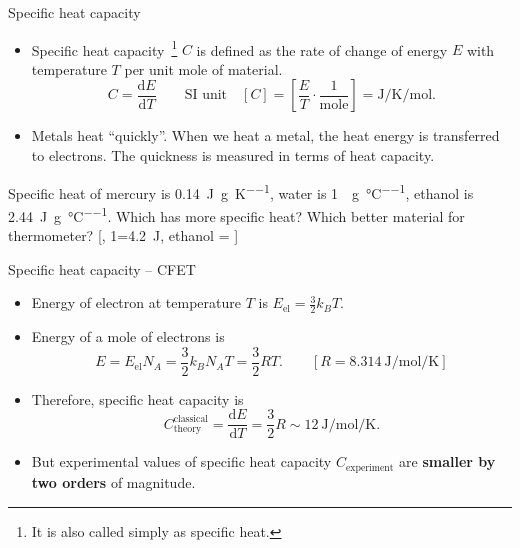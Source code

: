 %
%
%
\begin{frame}[label=pre-M2T1-slot1]{Specific heat capacity}
	\begin{definition}
		\begin{itemize}
			\item Specific heat capacity~\footnote{It is also called simply as specific heat.} \(C\) is defined as the rate of change of energy \(E\) with temperature \(T\) per unit mole of material.
			\[
			C = \frac{\mathrm{d}E}{\mathrm{d}T}
			\quad\quad
			\text{SI unit}
			\quad 
			[C] = \left[ \frac{E}{T}\cdot \frac{1}{\text{mole}}\right] = \si{\joule\per\kelvin\per\mole}.
			\]
		\end{itemize}
	\end{definition}
	\begin{itemize}
		\item Metals heat ``quickly''. When we heat a metal, the heat energy is transferred to electrons. The quickness is measured in terms of heat capacity.
	\end{itemize}
	\begin{problem}
		Specific heat of mercury is \SI{0.14}{\joule\per\gram\per\kelvin}, water is \SI{1}{\calorie\per\gram\per\celsius}, ethanol is \SI{2.44}{\joule\per\gram\per\celsius}. Which has more specific heat? Which better material for thermometer? \hfill [, \SI{1}{\calorie}=\SI{4.2}{\joule}, ethanol = ]
	\end{problem}
\end{frame}
%
\begin{frame}[label=pre-M2T1-slot1]{Specific heat capacity -- CFET}
		\begin{itemize}
		\item Energy of electron at temperature \(T\) is
		\(
		E_\mathrm{el} = \frac{3}{2} k_B T.
		\)
		\item Energy of a mole of electrons is
		\[
		E = E_\mathrm{el} N_A =  \frac{3}{2} k_B N_A T  = \frac{3}{2} R T. \qquad \left[R = \SI{8.314}{\joule\per\mole\per\kelvin} \right]
		\]
		\item Therefore, specific heat capacity is
		\[
		C_\mathrm{theory}^\text{classical} = \frac{\mathrm{d} E}{\mathrm{d} T} = \frac{3}{2} R \sim \SI{12}{\joule\per\mole\per\kelvin}.
		\]
		\item But experimental values of specific heat capacity \(C_\text{experiment}\) are \textbf{smaller by two orders} of magnitude.
	\end{itemize}
\end{frame}
